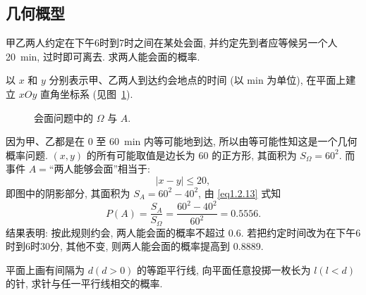 \subsection{几何概型}

\begin{example}[会商问题]
    甲乙两人约定在下午6时到7时之间在某处会面,
    并约定先到者应等候另一个人 \SI{20}{\minute},
    过时即可离去.
    求两人能会面的概率.
\end{example}

\begin{solution}
    以 $x$ 和 $y$ 分别表示甲、乙两人到达约会地点的时间 (以 \si{\minute} 为单位),
    在平面上建立 $xOy$ 直角坐标系 (见图~\ref{fig1.2.3}).

    \begin{figure}[!ht]
        \centering
        \caption{会面问题中的 $\Omega$ 与 $A$.}
        \label{fig1.2.3}
    \end{figure}

    因为甲、乙都是在 0 至 \SI{60}{\minute} 内等可能地到达,
    所以由等可能性知这是一个几何概率问题.
    $(x, y)$ 的所有可能取值是边长为 60 的正方形,
    其面积为 $S_\Omega = 60^2$.
    而事件 $A =$“两人能够会面”相当于:
    \[
        | x - y | \le 20,
    \]
    即图中的阴影部分,
    其面积为 $S_A = 60^2 - 40^2$,
    由 \eqref{eq1.2.13} 式知
    \[
        P (A) = \frac{S_A}{S_\Omega} = \frac{60^2 - 40^2}{60^2} = 0.5556.
    \]
    结果表明:
    按此规则约会,
    两人能会面的概率不超过 0.6.
    若把约定时间改为在下午6时到6时30分,
    其他不变,
    则两人能会面的概率提高到 \num{0.8889}.
\end{solution}

\begin{example}[蒲丰投针问题]
    平面上画有间隔为 $d (d > 0)$ 的等距平行线,
    向平面任意投掷一枚长为 $l (l<d)$ 的针,
    求针与任一平行线相交的概率.
\end{example}


